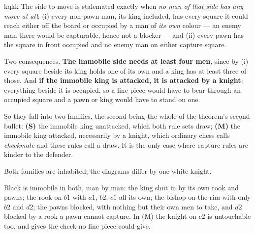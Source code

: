 \documentclass[10pt]{article}
\begin{document}
\begin{result}[title={Corollary. The surviving stalemates are exactly the totally immobile positions}]{kqkk}
The side to move is stalemated exactly when \emph{no man of that side has any
move at all}: (i) every non-pawn man, its king included, has every square it
could reach either off the board or occupied by a man of \emph{its own} colour
--- an enemy man there would be capturable, hence not a blocker --- and (ii)
every pawn has the square in front occupied and no enemy man on either capture
square.

\smallskip
Two consequences. \textbf{The immobile side needs at least four men}, since by
(i) every square beside its king holds one of its own and a king has at least
three of those. And \textbf{if the immobile king is attacked, it is attacked by
a knight}: everything beside it is occupied, so a line piece would have to bear
through an occupied square and a pawn or king would have to stand on one.

\smallskip
So they fall into two families, the second being the whole of the theorem's
second bullet: \textbf{(S)} the immobile king unattacked, which both rule sets
draw; \textbf{(M)} the immobile king attacked, necessarily by a knight, which
ordinary chess calls \emph{checkmate} and these rules call a draw. It is the
only case where capture rules are kinder to the defender.
\end{result}

\noindent
Both families are inhabited; the diagrams differ by one white knight.

\medskip
\noindent
\begin{minipage}[t]{0.30\textwidth}
\end{minipage}\hfill
\begin{minipage}[t]{0.30\textwidth}
\end{minipage}\hfill
\begin{minipage}[t]{0.36\textwidth}\vspace{0pt}\small
Black is immobile in both, man by man: the king shut in by its own rook and
pawns; the rook on $b1$ with $a1$, $b2$, $c1$ all its own; the bishop on the
rim with only $b2$ and $d2$; the pawns blocked, with nothing but their own men
to take, and $d2$ blocked by a rook a pawn cannot capture. In (M) the knight on
$c2$ is untouchable too, and gives the check no line piece could give.
\end{minipage}
\end{document}
